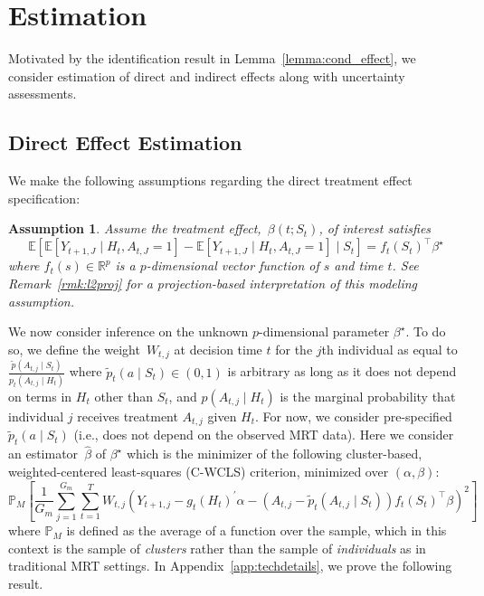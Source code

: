 \documentclass[12pt]{article}
\def\E{\mathbb{E}}
\newtheorem{assumption}[thm]{Assumption}
\begin{document}
\section{Estimation}
\label{section:estimation}

Motivated by the identification result in Lemma~\ref{lemma:cond_effect}, we consider estimation of direct and indirect effects along with uncertainty assessments.

\subsection{Direct Effect Estimation}
We make the following assumptions regarding the direct treatment effect specification:

\begin{assumption} \normalfont
\label{ass:directeffect}
Assume the treatment effect,~$\beta(t;S_t)$, of interest satisfies
$$
\E \left[ \E \left[ Y_{t+1, J} \mid H_t, A_{t,J} = 1 \right] - \E \left[ Y_{t+1, J} \mid H_t, A_{t,J} = 1 \right] \mid S_t \right] = f_t (S_t)^\top \beta^\star
$$
where $f_t (s) \in \mathbb{R}^p$ is a $p$-dimensional vector function of $s$ and time $t$. See Remark~\ref{rmk:l2proj} for a projection-based interpretation of this modeling assumption.
\end{assumption}

We now consider inference on the unknown $p$-dimensional parameter $\beta^\star$. To do so, we define the weight~$W_{t,j}$ at decision time $t$ for the $j$th individual as equal to $\frac{\tilde p (A_{t,j} \mid S_t)}{p_t (A_{t,j} \mid H_t)}$ where $\tilde p_t (a \mid S_t)\in (0,1)$ is arbitrary as long as it does not depend on terms in $H_t$ other than $S_t$, and $p(A_{t,j} \mid H_t)$ is the marginal probability that individual $j$ receives treatment $A_{t,j}$ given $H_t$.  For now, we consider pre-specified $\tilde p_t (a \mid S_t)$  (i.e., does not depend on the observed MRT data). Here we consider an estimator~$\hat \beta$ of $\beta^\star$ which is the minimizer of the following cluster-based,  weighted-centered least-squares (C-WCLS) criterion, minimized over $(\alpha, \beta)$:
\begin{equation}
\label{eq:directwcls}
\mathbb{P}_M \left[ \frac{1}{G_m} \sum_{j=1}^{G_m} \sum_{t=1}^T W_{t,j} \left(Y_{t+1,j} - g_t (H_t)^\prime \alpha - (A_{t,j} - \tilde p_t (A_{t,j} \mid S_t)) f_t(S_t)^\top \beta \right)^2 \right]
\end{equation}
where $\mathbb{P}_M$ is defined as the average of a function over the sample, which in this context is the sample of \emph{clusters} rather than the sample of \emph{individuals} as in traditional MRT settings. In Appendix~\ref{app:techdetails}, we prove the following result.
\end{document}
